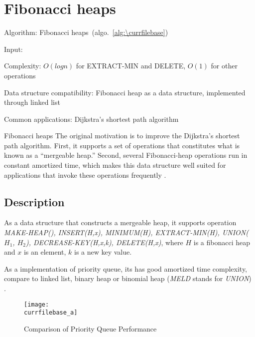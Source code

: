 \documentclass[catalog.tex]{subfiles}
\begin{document}
\def\pbname{Fibonacci heaps} %

\section{\pbname} 

\begin{overview}
\item [Algorithm:] Fibonacci heaps~(algo.~\ref{alg:\currfilebase}) 
\item [Input:] 
\item [Complexity:] $O(logn)$ for EXTRACT-MIN and DELETE, $O(1)$ for other operations 
\item [Data structure compatibility:] Fibonacci heap as a data structure, implemented through linked list 
\item [Common applications:] Dijkstra's shortest path algorithm
\end{overview}


\begin{problem}{\pbname}
	The original motivation is to improve the Dijkstra's shortest path algorithm. First, it supports a set of operations that constitutes what is known as a “mergeable heap.” Second, several Fibonacci-heap operations run in constant amortized time, which makes this data structure well suited for applications that invoke these operations frequently \cite{1}.
\end{problem}


\subsection*{Description}
As a data structure that constructs a mergeable heap, it supports operation \textit{MAKE-HEAP(), INSERT(H,x), MINIMUM(H), EXTRACT-MIN(H), UNION($H_1$, $H_2$), DECREASE-KEY(H,x,k), DELETE(H,x)}, where $H$ is a fibonacci heap and $x$ is an element, $k$ is a new key value. 

As a implementation of priority queue, its has good amortized time complexity, compare to linked list, binary heap or binomial heap (\textit{MELD} stands for \textit{UNION}) \cite{2}.
\begin{figure}[!htb]
	\centering
\texttt{[image: \\currfilebase\_a]}
	\caption{Comparison of Priority Queue Performance}
\end{figure}
\end{document}
